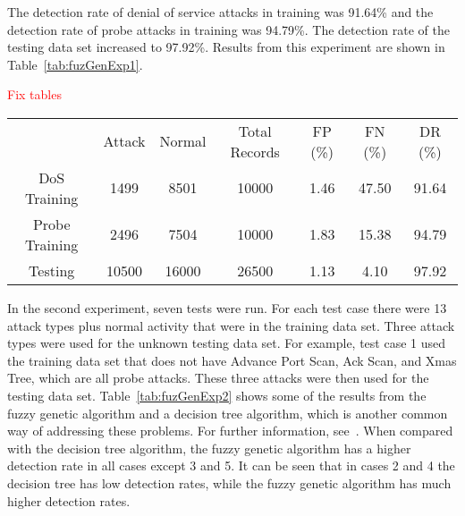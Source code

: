 \documentclass{sig-alternate}
\newcommand{\mycomment}[1]{\textcolor{red}{#1}}
\begin{document}
The detection rate of denial of service attacks in training was 91.64\% and the detection rate of probe attacks in training was 94.79\%. The detection rate of the testing data set increased to 97.92\%. Results from this experiment are shown in Table~\ref{tab:fuzGenExp1}.

\mycomment{Fix tables}

\begin{table*}
\center
\caption{Results from Experiment 1}
\begin{tabular}{ccccccc}
 & Attack & Normal & Total Records & FP (\%) & FN (\%) & DR (\%)\\
DoS Training & 1499 & 8501 & 10000 & 1.46 & 47.50 & 91.64\\
Probe Training & 2496 & 7504 & 10000 & 1.83 & 15.38 & 94.79\\
Testing & 10500 & 16000 & 26500 & 1.13 & 4.10 & 97.92\\
\end{tabular}
\label{tab:fuzGenExp1}
\center
\end{table*}

In the second experiment, seven tests were run. For each test case there were 13 attack types plus normal activity that were in the training data set. Three attack types were used for the unknown testing data set. For example, test case 1 used the training data set that does not have Advance Port Scan, Ack Scan, and Xmas Tree, which are all probe attacks. These three attacks were then used for the testing data set. Table~\ref{tab:fuzGenExp2} shows some of the results from the fuzzy genetic algorithm and a decision tree algorithm, which is another common way of addressing these problems. For further information, see~\cite{decisionTree}. When compared with the decision tree algorithm, the fuzzy genetic algorithm has a higher detection rate in all cases except 3 and 5. It can be seen that in cases 2 and 4 the decision tree has low detection rates, while the fuzzy genetic algorithm has much higher detection rates.
\end{document}
